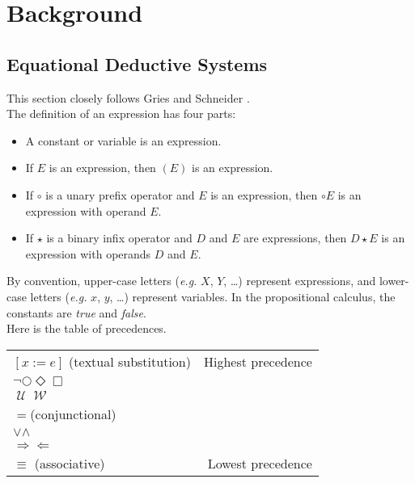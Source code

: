 \documentclass[fleqn, leqno]{article}
\newcommand{\llgap}{6pt}                            %
\newcommand{\impl}{\ensuremath{\Rightarrow}}        %
\newcommand{\foll}{\ensuremath{\Leftarrow}}         %
\newcommand{\Until}{\;\mathcal{U}\;}
\newcommand{\Wait}{\;\mathcal{W}\;}
\newcommand{\Next}{\bigcirc}
\newcommand{\Event}{\Diamond}
\newcommand{\Always}{\Box}
\begin{document}
\section{Background}

\subsection{Equational Deductive Systems}

This section closely follows Gries and Schneider \cite{LADM}.\\

The definition of an expression has four parts:
\begin{itemize}[$\bullet$]
\item A constant or variable is an expression.
\item If $E$ is an expression, then $(E)$ is an expression.
\item If $\circ$ is a unary prefix operator and $E$ is an expression, then $\circ E$ is an expression with operand $E$.
\item If $\star$ is a binary infix operator and $D$ and $E$ are expressions, then $D \star E$ is an expression with operands $D$
and $E$.
\end{itemize}

By convention, upper-case letters ({\itshape e.g.\/} $X$, $Y$, \dots) represent expressions,
and lower-case letters ({\itshape e.g.\/} $x$, $y$, \dots) represent variables.
In the propositional calculus, the constants are {\itshape true\/} and {\itshape false\/}.\\

Here is the table of precedences.\\

\setlength\extrarowheight{2pt}
\begin{tabular}{lr}
\hline
$[x := e]$ (textual substitution) & Highest precedence\\
$\neg$\quad $\Next$\quad $\Event$\quad $\Always$ &\\
$\Until$\quad $\Wait$ &\\
$=$\quad (conjunctional) &\\
$\lor$\quad $\land$ &\\
$\impl$\quad $\foll$ &\\
$\equiv$ \quad (associative) & Lowest precedence\\
\hline
\end{tabular}\\[\llgap]
\end{document}
